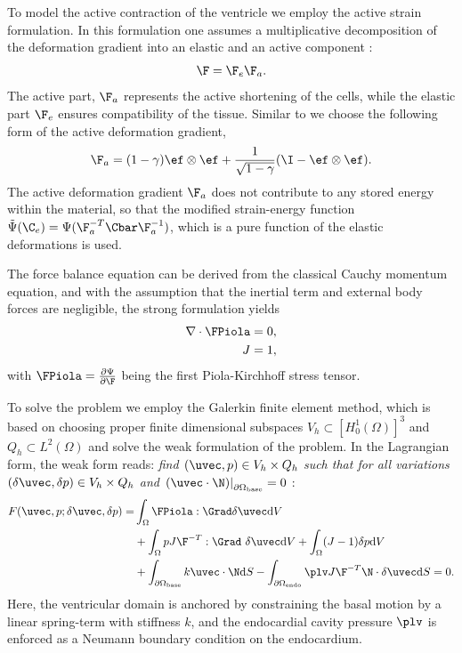 To model the active contraction of the ventricle we employ the active
strain formulation. In this formulation one assumes a multiplicative 
decomposition of the deformation gradient into an elastic
and an active component \cite{ambrosi2011electromechanical}:
\begin{equation}
 \F = \F_e \F_a.
\label{eq:active_strain}
\end{equation}
The active part, $\F_a$ represents the active shortening of the cells,
while the elastic part $\F_e$ ensures compatibility of the tissue.
Similar to \cite{balaban2017high} we choose the following form of the active
deformation gradient,
\begin{equation}
  \F_a = (1 - \gamma) \ef \otimes \ef  + \frac{1}{\sqrt{1 - \gamma}} (\I - \ef \otimes \ef).
 \label{eq:active_strain_Fa_gjerald}
\end{equation}
The active deformation gradient $\F_a$ does not contribute to any
stored energy within the material, so that the modified
strain-energy function $\tilde{\Psi}(\C_e) = \Psi(\F_a^{-T} \Cbar
\F_a^{-1})$, which is a pure function of the elastic deformations is used.

The force balance equation can be derived from the classical Cauchy
momentum equation, and with the assumption that the inertial term and
external body forces are negligible, the strong formulation yields
\begin{align}
  \nabla \cdot \FPiola &= 0, \\
  J &= 1, 
\end{align}
with $\FPiola = \frac{\partial \Psi}{\partial \F}$ being the first
Piola-Kirchhoff stress tensor. 

To solve the problem we employ the Galerkin finite element method, which is based
on choosing proper finite dimensional subspaces $V_h \subset [H_0^1(\Omega)]^3$ and
$Q_h \subset L^2(\Omega)$ and solve the weak formulation of the problem. In
the Lagrangian form, the weak form reads: {\it find $(\uvec,p)
\in V_h\times Q_h$ such that for all variations $(\delta
\uvec, \delta p) \in V_h \times Q_h $ and $\left. \left( \uvec \cdot \N \right)
\right|_{\partial \Omega_{\mathrm{base}}} = 0$ }:
\begin{align}
\begin{split}
  F(\uvec, p;\delta \uvec, \delta p) =
  &\int_{\Omega} \FPiola :  \Grad \delta \uvec  \mathrm{d} V  \\
  &+\int_{\Omega} p J \F^{-T} : \Grad \ \delta \uvec   \mathrm{d} V  
  +\int_{\Omega} (J - 1) \delta p \mathrm{d} V \\
  &+\int_{\partial \Omega_{\text{base}}} k \uvec \cdot \N \mathrm{d}S
  - \int_{\partial \Omega_{\text{endo}}} \plv J \F^{-T} \N \cdot \delta \uvec \mathrm{d}S= 0.
  \label{eq:force_balance}
\end{split}
\end{align}
Here, the ventricular domain is anchored by constraining the basal
motion by a linear spring-term with stiffness $k$, and the
endocardial cavity pressure $\plv$ is enforced as a Neumann boundary
condition on the endocardium.  

